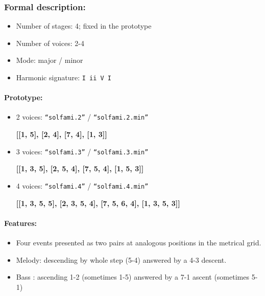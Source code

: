﻿\documentclass[11pt, openany]{article}
\begin{document}
\begin{itemize}
\subsubsection{Formal description:}
\begin{itemize}
\item Number of stages: 4; fixed in the prototype
\item Number of voices: 2-4
\item Mode: major / minor
\item Harmonic signature: \texttt{I ii V I}
\end{itemize}

\paragraph{Prototype:}
\begin{itemize}
\item 2 voices: \texttt{“solfami.2”} / \texttt{“solfami.2.min”}
	\begin{center}
	\textbf{[[1, 5], [2, 4], [7, 4], [1, 3]]}
	\end{center}
\item 3 voices: \texttt{“solfami.3”} / \texttt{“solfami.3.min”}
	\begin{center}
	\textbf{[[1, 3, 5], [2, 5, 4], [7, 5, 4], [1, 5, 3]]}
	\end{center}
\item 4 voices: \texttt{“solfami.4”} / \texttt{“solfami.4.min”}
	\begin{center}
	\textbf{[[1, 3, 5, 5], [2, 3, 5, 4], [7, 5, 6, 4], [1, 3, 5, 3]]}
	\end{center}
\end{itemize}

\paragraph{Features:}
\begin{itemize}
\item Four events presented as two pairs at analogous positions in the metrical grid.
\item Melody: descending by whole step (5-4) answered by a 4-3 descent.
\item Bass : ascending 1-2 (sometimes 1-5)  answered by a 7-1 ascent (sometimes 5-1) 
\end{itemize}


\end{itemize}
\end{document}
